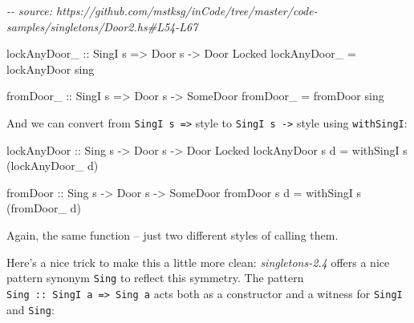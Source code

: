 \documentclass[]{article}
\newenvironment{Shaded}{}{}
\newcommand{\CommentTok}[1]{\textcolor[rgb]{0.38,0.63,0.69}{\textit{#1}}}
\newcommand{\DataTypeTok}[1]{\textcolor[rgb]{0.56,0.13,0.00}{#1}}
\newcommand{\NormalTok}[1]{#1}
\newcommand{\OtherTok}[1]{\textcolor[rgb]{0.00,0.44,0.13}{#1}}
\begin{document}
\begin{Shaded}
\begin{Highlighting}[]
\CommentTok{{-}{-} source: https://github.com/mstksg/inCode/tree/master/code{-}samples/singletons/Door2.hs\#L54{-}L67}

\OtherTok{lockAnyDoor\_ ::} \DataTypeTok{SingI}\NormalTok{ s }\OtherTok{=\textgreater{}} \DataTypeTok{Door}\NormalTok{ s }\OtherTok{{-}\textgreater{}} \DataTypeTok{Door} \DataTypeTok{\textquotesingle{}Locked}
\NormalTok{lockAnyDoor\_ }\OtherTok{=}\NormalTok{ lockAnyDoor sing}

\OtherTok{fromDoor\_ ::} \DataTypeTok{SingI}\NormalTok{ s }\OtherTok{=\textgreater{}} \DataTypeTok{Door}\NormalTok{ s }\OtherTok{{-}\textgreater{}} \DataTypeTok{SomeDoor}
\NormalTok{fromDoor\_ }\OtherTok{=}\NormalTok{ fromDoor sing}
\end{Highlighting}
\end{Shaded}

And we can convert from \texttt{SingI\ s\ =\textgreater{}} style to
\texttt{SingI\ s\ -\textgreater{}} style using \texttt{withSingI}:

\begin{Shaded}
\begin{Highlighting}[]
\OtherTok{lockAnyDoor ::} \DataTypeTok{Sing}\NormalTok{ s }\OtherTok{{-}\textgreater{}} \DataTypeTok{Door}\NormalTok{ s }\OtherTok{{-}\textgreater{}} \DataTypeTok{Door} \DataTypeTok{\textquotesingle{}Locked}
\NormalTok{lockAnyDoor s d }\OtherTok{=}\NormalTok{ withSingI s (lockAnyDoor\_ d)}

\OtherTok{fromDoor ::} \DataTypeTok{Sing}\NormalTok{ s }\OtherTok{{-}\textgreater{}} \DataTypeTok{Door}\NormalTok{ s }\OtherTok{{-}\textgreater{}} \DataTypeTok{SomeDoor}
\NormalTok{fromDoor s d }\OtherTok{=}\NormalTok{ withSingI s (fromDoor\_ d)}
\end{Highlighting}
\end{Shaded}

Again, the same function -- just two different styles of calling them.

Here's a nice trick to make this a little more clean: \emph{singletons-2.4}
offers a nice pattern synonym \texttt{Sing} to reflect this symmetry. The
pattern \texttt{Sing\ ::\ SingI\ a\ =\textgreater{}\ Sing\ a} acts both as a
constructor and a witness for \texttt{SingI} and \texttt{Sing}:
\end{document}
